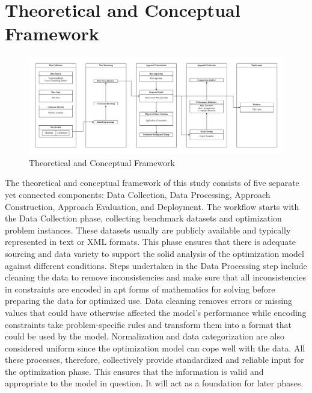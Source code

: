 \section{Theoretical and Conceptual Framework}
\label{sec:theoreticalframework}

\begin{figure}[h] %
    \centering
    \includegraphics[width=1\textwidth]{framework}
    \caption{Theoretical and Conceptual Framework}
    \label{fig:framework} %
\end{figure}

The theoretical and conceptual framework of this study consists of five separate yet connected components: Data Collection, Data Processing, Approach Construction, Approach Evaluation, and Deployment. The workflow starts with the Data Collection phase, collecting benchmark datasets and optimization problem instances. These datasets usually are publicly available and typically represented in text or XML formats. This phase ensures that there is adequate sourcing and data variety to support the solid analysis of the optimization model against different conditions. Steps undertaken in the Data Processing step include cleaning the data to remove inconsistencies and make sure that all inconsistencies in constraints are encoded in apt forms of mathematics for solving before preparing the data for optimized use. Data cleaning removes errors or missing values that could have otherwise affected the model's performance while encoding constraints take problem-specific rules and transform them into a format that could be used by the model. Normalization and data categorization are also considered uniform since the optimization model can cope well with the data. All these processes, therefore, collectively provide standardized and reliable input for the optimization phase. This ensures that the information is valid and appropriate to the model in question. It will act as a foundation for later phases.

